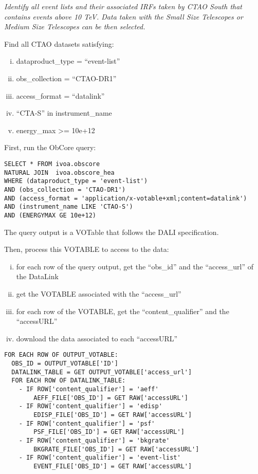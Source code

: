 {\em Identify all event lists and their associated \glspl{IRF} taken by CTAO South that contains events above 10 TeV. Data taken with the Small Size Telescopes or Medium Size Telescopes can be then selected. \/}

\medskip
\noindent Find all CTAO datasets satisfying:
\begin{enumerate}[(i)]
  \item dataproduct\_type = ``event-list''
  \item obs\_collection = ``CTAO-DR1''
  \item access\_format = ``datalink''
  \item ``CTA-S'' in instrument\_name
  \item energy\_max >= 10e+12
\end{enumerate}

First, run the ObCore query:
\begin{verbatim}
SELECT * FROM ivoa.obscore
NATURAL JOIN  ivoa.obscore_hea
WHERE (dataproduct_type = 'event-list')
AND (obs_collection = 'CTAO-DR1')
AND (access_format = 'application/x-votable+xml;content=datalink')
AND (instrument_name LIKE 'CTAO-S')
AND (ENERGYMAX GE 10e+12)
\end{verbatim}
The query output is a VOTable that follows the DALI specification.

\medskip
\noindent Then, process this VOTABLE to access to the data:
\begin{enumerate}[(i)]
  \item for each row of the query output, get the ``obs\_id'' and the ``access\_url'' of the DataLink
  \item get the VOTABLE associated with the ``access\_url''
  \item for each row of the VOTABLE, get the ``content\_qualifier'' and the ``accessURL''
  \item download the data associated to each ``accessURL''
\end{enumerate}

\begin{verbatim}
FOR EACH ROW OF OUTPUT_VOTABLE:
  OBS_ID = OUTPUT_VOTABLE['ID']
  DATALINK_TABLE = GET OUTPUT_VOTABLE['access_url']
  FOR EACH ROW OF DATALINK_TABLE:
    - IF ROW['content_qualifier'] = 'aeff'
    	AEFF_FILE['OBS_ID'] = GET RAW['accessURL']
    - IF ROW['content_qualifier'] = 'edisp'
    	EDISP_FILE['OBS_ID'] = GET RAW['accessURL']
    - IF ROW['content_qualifier'] = 'psf'
    	PSF_FILE['OBS_ID'] = GET RAW['accessURL']
    - IF ROW['content_qualifier'] = 'bkgrate'
    	BKGRATE_FILE['OBS_ID'] = GET RAW['accessURL']
    - IF ROW['content_qualifier'] = 'event-list'
    	EVENT_FILE['OBS_ID'] = GET RAW['accessURL']
\end{verbatim}



